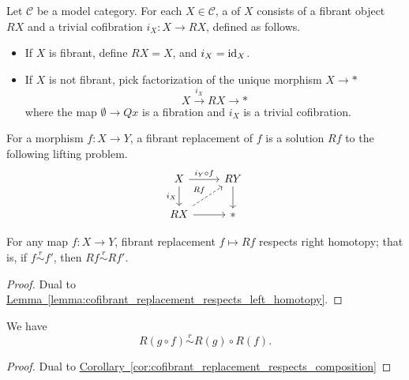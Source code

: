 \documentclass[main.tex]{subfiles}
\begin{document}
\begin{definition}
  \label{def:fibrant_replacement}
  Let $\mathcal{C}$ be a model category. For each $X \in \mathcal{C}$, a  of $X$ consists of a fibrant object $RX$ and a trivial cofibration $i_{X}\colon X \to RX$, defined as follows.
  \begin{itemize}
    \item If $X$ is fibrant, define $RX = X$, and $i_{X} = \mathrm{id}_{X}$.

    \item If $X$ is not fibrant, pick factorization of the unique morphism $X \to *$
      \begin{equation*}
        X \overset{i_{X}}{\to} RX \to *
      \end{equation*}
      where the map $\emptyset \to Qx$ is a fibration and $i_{X}$ is a trivial cofibration.
  \end{itemize}

  For a morphism $f\colon X \to Y$, a fibrant replacement of $f$ is a solution $Rf$ to the following lifting problem.
  \begin{equation*}
    \begin{tikzcd}
      X
      \arrow[r, "i_{Y} \circ f"]
      \arrow[d, swap, "i_{X}"]
      & RY
      \arrow[d]
      \\
      RX
      \arrow[r]
      \arrow[ur, dashed, "Rf"]
      & *
    \end{tikzcd}
  \end{equation*}
\end{definition}

\begin{lemma}
  \label{lemma:fibrant_replacement_respects_right_homotopy}
  For any map $f\colon X \to Y$, fibrant replacement $f \mapsto Rf$ respects right homotopy; that is, if $f \overset{r}{\sim} f'$, then $Rf \overset{r}{\sim} Rf'$.
\end{lemma}
\begin{proof}
  Dual to \hyperref[lemma:cofibrant_replacement_respects_left_homotopy]{Lemma~\ref*{lemma:cofibrant_replacement_respects_left_homotopy}}.
\end{proof}

\begin{corollary}
  We have
  \begin{equation*}
    R(g \circ f) \overset{r}{\sim} R(g) \circ R(f).
  \end{equation*}
\end{corollary}
\begin{proof}
  Dual to \hyperref[cor:cofibrant_replacement_respects_composition]{Corollary~\ref*{cor:cofibrant_replacement_respects_composition}}
\end{proof}
\end{document}
